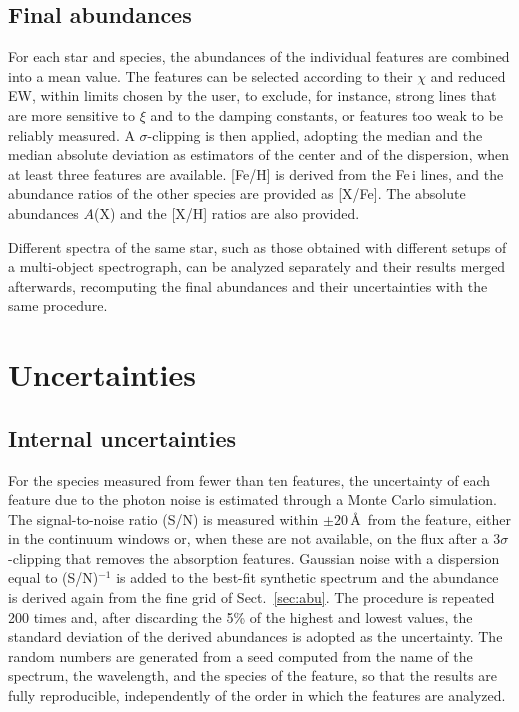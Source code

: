 \documentclass{aa}
\begin{document}
\subsection{Final abundances}
\label{sec:final_abu}

For each star and species, the abundances of the individual features
are combined into a mean value. The features can be selected according
to their $\chi$ and reduced EW, within limits chosen by the user, to
exclude, for instance, strong lines that are more sensitive to $\xi$
and to the damping constants, or features too weak to be reliably
measured. A $\sigma$-clipping is then applied, adopting the median and
the median absolute deviation as estimators of the center and of the
dispersion, when at least three features are available. [Fe/H] is
derived from the Fe\,{\sc i} lines, and the abundance ratios of the
other species are provided as [X/Fe]. The absolute abundances $A$(X)
and the [X/H] ratios are also provided.

Different spectra of the same star, such as those obtained with
different setups of a multi-object spectrograph, can be analyzed
separately and their results merged afterwards, recomputing the final
abundances and their uncertainties with the same procedure.

\section{Uncertainties}
\label{sec:errors}

\subsection{Internal uncertainties}
\label{sec:errors_int}

For the species measured from fewer than ten features, the uncertainty
of each feature due to the photon noise is estimated through a Monte
Carlo simulation. The signal-to-noise ratio (S/N) is measured within
$\pm20$\,\AA\ from the feature, either in the continuum windows or,
when these are not available, on the flux after a $3\sigma$-clipping
that removes the absorption features. Gaussian noise with a dispersion
equal to (S/N)$^{-1}$ is added to the best-fit synthetic spectrum and
the abundance is derived again from the fine grid of
Sect.~\ref{sec:abu}. The procedure is repeated 200 times and, after
discarding the 5\% of the highest and lowest values, the standard
deviation of the derived abundances is adopted as the uncertainty. The
random numbers are generated from a seed computed from the name of the
spectrum, the wavelength, and the species of the feature, so that the
results are fully reproducible, independently of the order in which
the features are analyzed.
\end{document}
